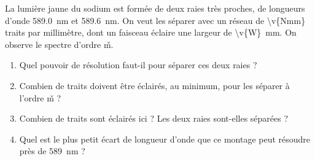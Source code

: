 La lumière jaune du sodium est formée de deux raies très proches, de longueurs d'onde \qty{589.0}{nm} et \qty{589.6}{nm}. On veut les séparer avec un réseau de \num{\v{Nmm}} traits par millimètre, dont un faisceau éclaire une largeur de \qty{\v{W}}{mm}. On observe le spectre d'ordre \v{m}.

\begin{enumerate}[label=\alph*)]
    \item Quel pouvoir de résolution faut-il pour séparer ces deux raies ?
    \item Combien de traits doivent être éclairés, au minimum, pour les séparer à l'ordre \v{m} ?
    \item Combien de traits sont éclairés ici ? Les deux raies sont-elles séparées ?
    \item Quel est le plus petit écart de longueur d'onde que ce montage peut résoudre près de \qty{589}{nm} ?
\end{enumerate}
